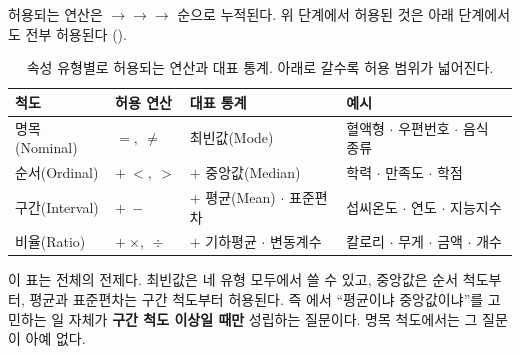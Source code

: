 허용되는 연산은 $\to$$\to$$\to$
순으로 누적된다. 위 단계에서 허용된 것은 아래 단계에서도 전부 허용된다
().

\begin{table}[ht]\centering
\caption{속성 유형별로 허용되는 연산과 대표 통계. 아래로 갈수록 허용 범위가
넓어진다.}
\label{tab:attr-ops}
\begin{tabularx}{\linewidth}{@{}l l l X@{}}
\toprule
척도 & 허용 연산 & 대표 통계 & 예시 \\
\midrule
명목(Nominal)  & $=,\ \neq$                    & 최빈값(Mode)
               & 혈액형 $\cdot$ 우편번호 $\cdot$ 음식 종류 \\
순서(Ordinal)  & $+\ <,\ >$                    & $+$ 중앙값(Median)
               & 학력 $\cdot$ 만족도 $\cdot$ 학점 \\
구간(Interval) & $+\ -$                        & $+$ 평균(Mean) $\cdot$ 표준편차
               & 섭씨온도 $\cdot$ 연도 $\cdot$ 지능지수 \\
비율(Ratio)    & $+\ \times,\ \div$            & $+$ 기하평균 $\cdot$ 변동계수
               & 칼로리 $\cdot$ 무게 $\cdot$ 금액 $\cdot$ 개수 \\
\bottomrule
\end{tabularx}
\end{table}

이 표는  전체의 전제다. 최빈값은 네 유형 모두에서 쓸 수
있고, 중앙값은 순서 척도부터, 평균과 표준편차는 구간 척도부터 허용된다. 즉
에서 ``평균이냐 중앙값이냐''를 고민하는 일 자체가 \textbf{구간
척도 이상일 때만} 성립하는 질문이다. 명목 척도에서는 그 질문이 아예 없다.

